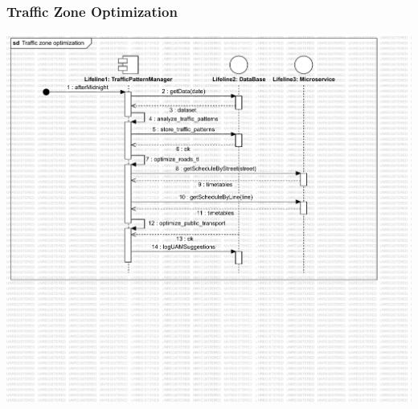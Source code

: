 \documentclass[12pt, a4paper, twoside, openright]{report}
\begin{document}
\subsubsection{Traffic Zone Optimization}


\includegraphics[width=\linewidth]{images/svg/traffic_zone_optimization.pdf}
\end{document}
